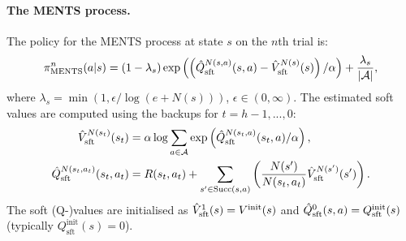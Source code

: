 \documentclass{article}
\newcommand{\cl}[1]{\mathcal{#1}}
\newcommand{\Vst}[2]{\hat{V}^{#2}_{\textnormal{sft}}(#1)}
\newcommand{\Qst}[3]{\hat{Q}^{#3}_{\textnormal{sft}}(#1,#2)}
\newcommand{\succc}[2]{\textnormal{Succ}(#1,#2)}
\theoremstyle{plain}
\begin{document}
\begin{appendices}
        \paragraph{The MENTS process.} 
        The policy for the MENTS process at state $s$ on the $n$th trial is:
        \begin{align}
            \pi^{n}_{\text{MENTS}}(a|s) = (1-\lambda_s)\exp\left(\left(\Qst{s}{a}{N(s,a)}-\Vst{s}{N(s)}\right)/\alpha\right) + \frac{\lambda_s}{|\cl{A}|}, \label{appeq:ments_soft_policy}
        \end{align}
        where $\lambda_s=\min(1,\epsilon/\log(e+N(s)))$, $\epsilon \in (0,\infty)$. The estimated soft values are computed using the backups for $t=h-1,...,0$:
        \begin{align}
            \Vst{s_t}{N(s_t)} &= \alpha \log \sum_{a\in\cl{A}} \exp \left(\Qst{s_t}{a}{N(s_t,a)}/\alpha \right), \label{appeq:soft_v_backup} \\
            \Qst{s_t}{a_t}{N(s_t,a_t)} &= R(s_t,a_t) + \sum_{s'\in\succc{s}{a}} \left( \frac{N(s')}{N(s_t,a_t)} \Vst{s'}{N(s')} \right). \label{appeq:soft_q_backup}
        \end{align}
        The soft (Q-)values are initialised as $\Vst{s}{1}=V^{\text{init}}(s)$ and $\Qst{s}{a}{0}=Q^{\text{init}}_{\text{sft}}(s)$ (typically $Q^{\text{init}}_{\text{sft}}(s)=0$).








\end{appendices}
\end{document}
